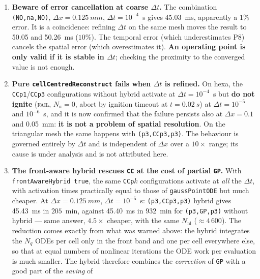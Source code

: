 \documentclass[11pt,a4paper]{article}
\newcommand{\code}[1]{\texttt{\small #1}}
\begin{document}
\begin{enumerate}[topsep=3pt,itemsep=3pt,leftmargin=1.5em]
        enough: it underestimates P8 by $\sim\SI{4.6}{ms}$ ($10\%$) on the high-order
        path.
  \item \textbf{Beware of error cancellation at coarse $\Delta t$.} The
        combination \code{(NO,na,NO)}, $\Delta x=\SI{0.125}{mm}$, $\Delta t=10^{-4}$~s
        gives \SI{45.03}{ms}, apparently a $1\%$ error. It is a coincidence: refining
        $\Delta t$ on the same mesh moves the result to \SI{50.05}{} and
        \SI{50.26}{ms} ($10\%$). The temporal error (which underestimates P8) cancels the
        spatial error (which overestimates it). \textbf{An operating point is only
        valid if it is stable in $\Delta t$}; checking the proximity to the
        converged value is not enough.
  \item \textbf{Pure \code{cellCentredReconstruct} fails when $\Delta t$ is refined.} On
        hexa, the \code{CCp1}/\code{CCp3} configurations without hybrid activate at
        $\Delta t=10^{-4}$~s but \textbf{do not ignite} (\textsc{fail}, $N_a=0$,
        abort by ignition timeout at $t=\SI{0.02}{s}$) at $\Delta t=10^{-5}$ and
        $10^{-6}$~s, and it is now confirmed that the failure persists also at
        $\Delta x=\SI{0.1}{}$ and \SI{0.05}{mm}: \textbf{it is not a problem of
        spatial resolution}. On the triangular mesh the same happens with \code{(p3,CCp3,p3)}.
        The behaviour is governed entirely by $\Delta t$ and is independent of
        $\Delta x$ over a $10\times$ range; its cause is under analysis and is
        not attributed here.
  \item \textbf{The front-aware hybrid rescues \code{CC} at the cost of partial
        \code{GP}.} With \code{frontAwareHybrid true}, the same \code{CCp$k$}
        configurations activate at \emph{all} the $\Delta t$, with activation
        times practically equal to those of \code{gaussPointODE} but much
        cheaper. At $\Delta x=\SI{0.125}{mm}$, $\Delta t=10^{-5}$~s:
        \code{(p3,CCp3,p3)} hybrid gives \SI{45.43}{ms} in $205$~min, against
        \SI{45.40}{ms} in $932$~min for \code{(p3,GP,p3)} without hybrid --- same
        answer, $4.5\times$ cheaper, with the same $N_{\mathrm{nl}}$
        ($\approx 4\,600$). The reduction comes exactly from what was warned above: the
        hybrid integrates the $N_q$ ODEs per cell only in the front band and one
        per cell everywhere else, so that at equal numbers of nonlinear iterations the
        ODE work per evaluation is much smaller. The hybrid therefore combines
        the \emph{correction} of \code{GP} with a good part of the \emph{saving} of

\end{enumerate}
\end{document}

